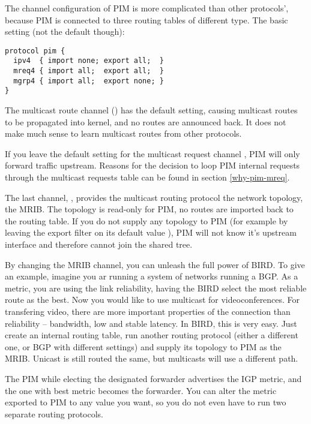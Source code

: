 The channel configuration of PIM is more complicated than other protocols',
because PIM is connected to three routing tables of different type. The basic
setting (not the default though):

\begin{lstlisting}
protocol pim {
  ipv4  { import none; export all;  }
  mreq4 { import all;  export all;  }
  mgrp4 { import all;  export none; }
}
\end{lstlisting}

\begin{figure}[htp]
\centering
\vskip 6cm
\caption{}
\label{pim-channels}
\end{figure}


The multicast route channel () has the default setting, causing
multicast routes to be propagated into kernel, and no routes are announced
back. It does not make much sense to learn multicast routes from other
protocols.

If you leave the default  setting for the multicast request
channel , PIM will only forward traffic upstream. Reasons for the
decision to loop PIM internal requests through the multicast requests table can
be found in section \ref{why-pim-mreq}.

The last channel, , provides the multicast routing protocol the
network topology, the MRIB. The topology is read-only for PIM, no routes are
imported back to the routing table. If you do not supply any topology to PIM
(for example by leaving the export filter on its default value ), PIM
will not know it's upstream interface and therefore cannot join the shared
tree.

By changing the MRIB channel, you can unleash the full power of BIRD. To give
an example, imagine you ar running a system of networks running a BGP. As
a metric, you are using the link reliability, having the BIRD select the most
reliable route as the best. Now you would like to use multicast for
videoconferences. For transfering video, there are more important properties of
the connection than reliability -- bandwidth, low and stable latency. In BIRD,
this is very easy. Just create an internal routing table, run another routing
protocol (either a different one, or BGP with different settings) and supply
its topology to PIM as the MRIB. Unicast is still routed the same, but
multicasts will use a different path.

The PIM while electing the designated forwarder advertises the IGP metric, and
the one with best metric becomes the forwarder. You can alter the metric
exported to PIM to any value you want, so you do not even have to run two
separate routing protocols.

